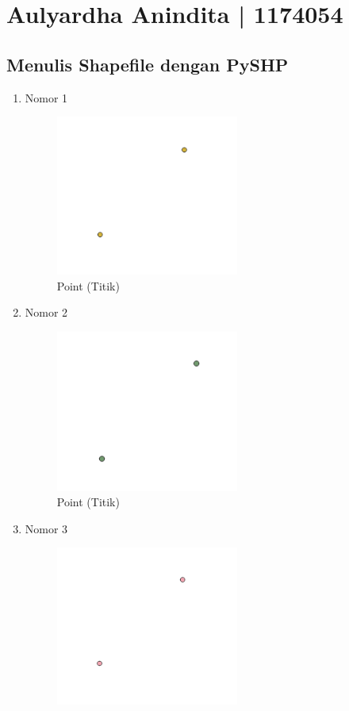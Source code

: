 \section{Aulyardha Anindita | 1174054}
\subsection{Menulis Shapefile dengan PySHP}
\begin{enumerate}
	\item Nomor 1
	
	\begin{figure}[H]
		\includegraphics[width=6cm]{figures/Tugas2/1174054/no1.png}
		\centering
		\caption{Point (Titik)}
	\end{figure}
	\item Nomor 2
	
	\begin{figure}[H]
		\includegraphics[width=6cm]{figures/Tugas2/1174054/no2.png}
		\centering
		\caption{Point (Titik)}
	\end{figure}
	\item Nomor 3
	
	\begin{figure}[H]
		\includegraphics[width=6cm]{figures/Tugas2/1174054/no3.png}

\end{figure}
\end{enumerate}

